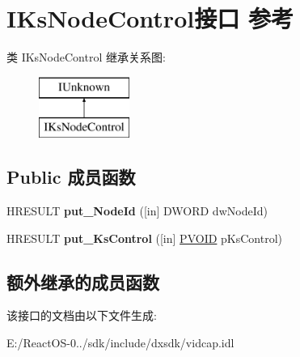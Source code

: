 \hypertarget{interface_i_ks_node_control}{}\section{I\+Ks\+Node\+Control接口 参考}
\label{interface_i_ks_node_control}
类 I\+Ks\+Node\+Control 继承关系图\+:\begin{figure}[H]
\begin{center}
\leavevmode
\includegraphics[height=2.000000cm]{interface_i_ks_node_control}
\end{center}
\end{figure}
\subsection*{Public 成员函数}
\begin{DoxyCompactItemize}
\item 
\mbox{\label{interface_i_ks_node_control_a5adc45b013de44d7be473efb9060b6e1}} 
H\+R\+E\+S\+U\+LT {\bfseries put\+\_\+\+Node\+Id} (\mbox{[}in\mbox{]} D\+W\+O\+RD dw\+Node\+Id)
\item 
\mbox{\label{interface_i_ks_node_control_a6b8236ae5a92efe22cc93f72415691c6}} 
H\+R\+E\+S\+U\+LT {\bfseries put\+\_\+\+Ks\+Control} (\mbox{[}in\mbox{]} \hyperlink{interfacevoid}{P\+V\+O\+ID} p\+Ks\+Control)
\end{DoxyCompactItemize}
\subsection*{额外继承的成员函数}


该接口的文档由以下文件生成\+:\begin{DoxyCompactItemize}
\item 
E\+:/\+React\+O\+S-\/0../sdk/include/dxsdk/vidcap.\+idl\end{DoxyCompactItemize}
